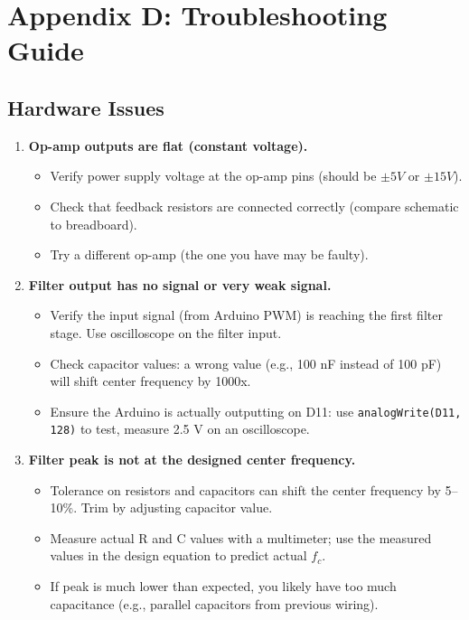 \documentclass[11pt,letterpaper]{article}
\begin{document}
\section*{Appendix D: Troubleshooting Guide}

\subsection*{Hardware Issues}

\begin{enumerate}
    \item \textbf{Op-amp outputs are flat (constant voltage).}
    \begin{itemize}
        \item Verify power supply voltage at the op-amp pins (should be $\pm 5V$ or $\pm 15V$).
        \item Check that feedback resistors are connected correctly (compare schematic to breadboard).
        \item Try a different op-amp (the one you have may be faulty).
    \end{itemize}

    \item \textbf{Filter output has no signal or very weak signal.}
    \begin{itemize}
        \item Verify the input signal (from Arduino PWM) is reaching the first filter stage. Use oscilloscope on the filter input.
        \item Check capacitor values: a wrong value (e.g., 100 nF instead of 100 pF) will shift center frequency by 1000x.
        \item Ensure the Arduino is actually outputting on D11: use \texttt{analogWrite(D11, 128)} to test, measure 2.5 V on an oscilloscope.
    \end{itemize}

    \item \textbf{Filter peak is not at the designed center frequency.}
    \begin{itemize}
        \item Tolerance on resistors and capacitors can shift the center frequency by 5--10\%. Trim by adjusting capacitor value.
        \item Measure actual R and C values with a multimeter; use the measured values in the design equation to predict actual $f_c$.
        \item If peak is much lower than expected, you likely have too much capacitance (e.g., parallel capacitors from previous wiring).
    \end{itemize}


\end{enumerate}
\end{document}
